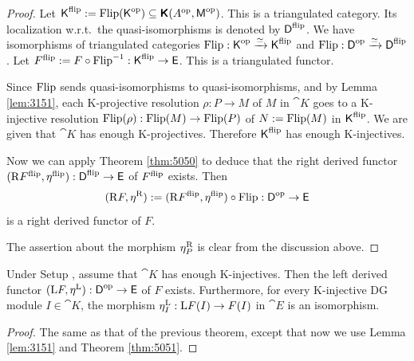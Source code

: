 \begin{proof}
Let 
$\operatorname{\mathsf{K}}^{\mathrm{flip}} := \operatorname{Flip}(\operatorname{\mathsf{K}}^{\mathrm{op}}) \subseteq
\boldsymbol{\mathsf{K}}(A^{\mathrm{op}}, \operatorname{\mathsf{M}}^{\mathrm{op}})$.
This is a triangulated category. Its localization w.r.t.\ the 
quasi-isomorphisms is denoted by $\operatorname{\mathsf{D}}^{\mathrm{flip}}$. We have isomorphisms of 
triangulated categories
$\operatorname{Flip} : \operatorname{\mathsf{K}}^{\mathrm{op}} \xrightarrow{\simeq} \operatorname{\mathsf{K}}^{\mathrm{flip}}$
and 
$\operatorname{Flip} : \operatorname{\mathsf{D}}^{\mathrm{op}} \xrightarrow{\simeq} \operatorname{\mathsf{D}}^{\mathrm{flip}}$.
Let 
$F^{\mathrm{flip}} := F \circ \operatorname{Flip}^{-1} : \operatorname{\mathsf{K}}^{\mathrm{flip}} \to \operatorname{\mathsf{E}}$.
This is a triangulated functor. 

Since $\operatorname{Flip}$ sends quasi-isomorphisms to 
quasi-isomorphisms, and by Lemma \ref{lem:3151}, each K-projective 
resolution
$\rho : P \to M$ of $M$ in $\cat{K}$ goes to a K-injective resolution 
$\operatorname{Flip}(\rho) : \operatorname{Flip}(M) \to \operatorname{Flip}(P)$
of $N := \operatorname{Flip}(M)$ in $\operatorname{\mathsf{K}}^{\mathrm{flip}}$. 
We are given that $\cat{K}$ has enough K-projectives. Therefore 
$\operatorname{\mathsf{K}}^{\mathrm{flip}}$ has enough K-injectives. 

Now we can apply Theorem \ref{thm:5050} to deduce that the right 
derived functor
$(\mathrm{R} F^{\mathrm{flip}}, \eta^{\mathrm{flip}}) : \operatorname{\mathsf{D}}^{\mathrm{flip}} 
\to \operatorname{\mathsf{E}}$
of $F^{\mathrm{flip}}$ exists. Then 
\[ (\mathrm{R} F, \eta^{\mathrm{R}}) := 
(\mathrm{R} F^{\mathrm{flip}}, \eta^{\mathrm{flip}}) \circ \operatorname{Flip} : 
\operatorname{\mathsf{D}}^{\mathrm{op}} \to \operatorname{\mathsf{E}} \]
is a right derived functor of $F$.

The assertion about the morphism $\eta^{\mathrm{R}}_P$ is clear from the 
discussion 
above. 
\end{proof}

\begin{thm} \label{thm:3151}
Under Setup \tup{\ref{set:3150}}, 
assume that $\cat{K}$ has enough K-injectives. 
Then the left derived functor 
$(\mathrm{L} F, \eta^{\mathrm{L}}) : \operatorname{\mathsf{D}}^{\mathrm{op}} \to \operatorname{\mathsf{E}}$
of $F$ exists. Furthermore, for every K-injective DG module
$I \in \cat{K}$, the morphism 
$\eta^{\mathrm{L}}_I : \mathrm{L} F(I) \to F(I)$ 
in $\cat{E}$ is an isomorphism. 
\end{thm}

\begin{proof}
The same as that of the previous theorem, except that now we use Lemma
\ref{lem:3151} and Theorem \ref{thm:5051}. 
\end{proof}








\cleardoublepage
{} \label{sec:exist-resol}     

